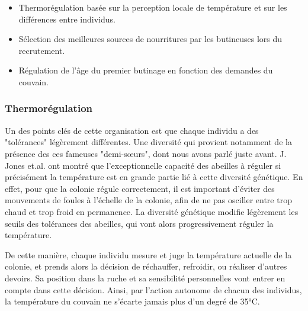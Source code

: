 			
			\begin{itemize}
				\item Thermorégulation basée sur la perception locale de température et sur les différences entre individus.
				\item Sélection des meilleures sources de nourritures par les butineuses lors du recrutement.
				\item Régulation de l'âge du premier butinage en fonction des demandes du couvain.
			\end{itemize}

			\subsubsection{Thermorégulation}			
			Un des points clés de cette organisation est que chaque individu a des "tolérances" légèrement différentes. Une diversité qui provient notamment de la présence des ces fameuses "demi-sœurs", dont nous avons parlé juste avant. J. Jones \cite{jones_honey_2004} et.al. ont montré que l'exceptionnelle capacité des abeilles à réguler si précisément la température est en grande partie lié à cette diversité génétique. En effet, pour que la colonie régule correctement, il est important d'éviter des mouvements de foules à l'échelle de la colonie, afin de ne pas osciller entre trop chaud et trop froid en permanence. La diversité génétique modifie légèrement les seuils des tolérances des abeilles, qui vont alors progressivement réguler la température.
			
			De cette manière, chaque individu mesure et juge la température actuelle de la colonie, et prends alors la décision de réchauffer, refroidir, ou réaliser d'autres devoirs. Sa position dans la ruche et sa sensibilité personnelles vont entrer en compte dans cette décision. Ainsi, par l'action autonome de chacun des individus, la température du couvain ne s'écarte jamais plus d'un degré de 35°C.
			
